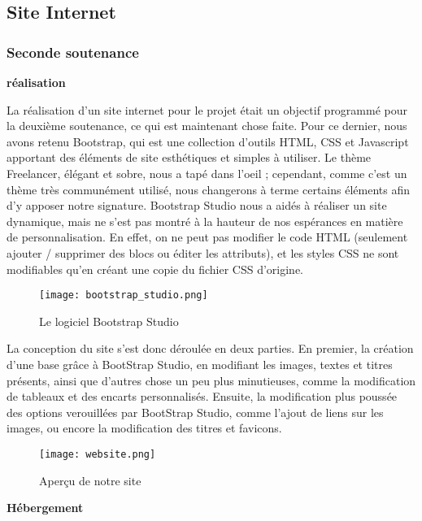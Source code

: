 \subsection{Site Internet}

    \subsubsection{Seconde soutenance}

    \textbf{réalisation}

    La réalisation d'un site internet pour le projet était un objectif
    programmé pour la deuxième soutenance, ce qui est maintenant chose faite.
    Pour ce dernier, nous avons retenu Bootstrap, qui est une collection
    d'outils HTML, CSS et Javascript apportant des éléments de site
    esthétiques et simples à utiliser. Le thème Freelancer, élégant et sobre,
    nous a tapé dans l'oeil ; cependant, comme c'est un thème très 
    communément utilisé, nous changerons à terme certains éléments afin 
    d'y apposer notre signature. Bootstrap Studio nous a aidés à réaliser
    un site dynamique, mais ne s'est pas montré à la hauteur de nos espérances
    en matière de personnalisation. En effet, on ne peut pas modifier
    le code HTML (seulement ajouter / supprimer des blocs ou éditer les
    attributs), et les styles CSS ne sont modifiables qu'en créant une copie
    du fichier CSS d'origine.

    \begin{figure}[hbt!]
        \centering
        \texttt{[image: bootstrap\_studio.png]}
        \caption{Le logiciel Bootstrap Studio}
    \end{figure}

    La conception du site s'est donc déroulée en deux parties. En premier, la création
    d'une base grâce à BootStrap Studio, en modifiant les images, textes et titres présents, ainsi
    que d'autres chose un peu plus minutieuses, comme la modification de tableaux et des encarts personnalisés.
    Ensuite, la modification plus poussée des options verouillées par BootStrap Studio, comme l'ajout de liens 
    sur les images, ou encore la modification des titres et favicons.

    \begin{figure}[hbt!]
        \centering
        \texttt{[image: website.png]}
        \caption{Aperçu de notre site}
    \end{figure}


    \textbf{Hébergement}

